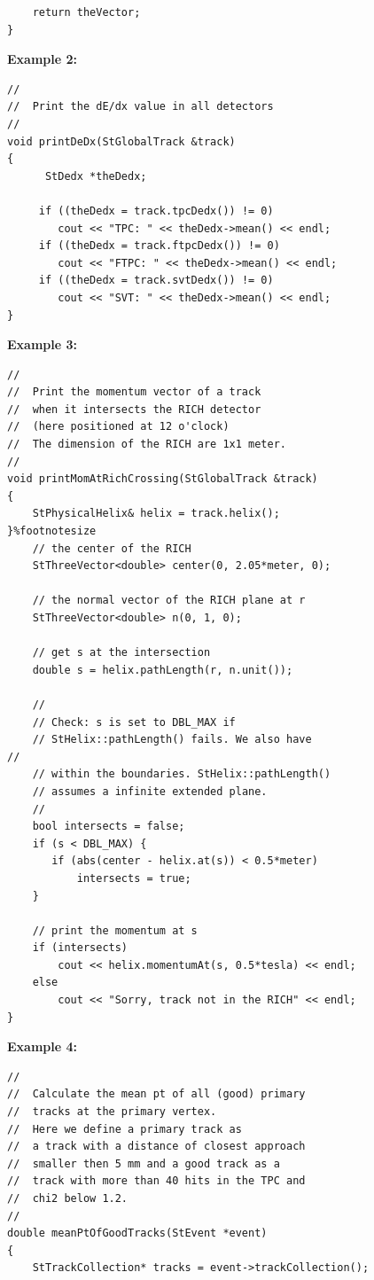 \begin{Entry}
{\begin{verbatim}
    return theVector;
}
\end{verbatim}
}%

{\bf Example 2:}
{\footnotesize
\begin{verbatim}
//
//  Print the dE/dx value in all detectors
//
void printDeDx(StGlobalTrack &track)
{
      StDedx *theDedx;

     if ((theDedx = track.tpcDedx()) != 0)
        cout << "TPC: " << theDedx->mean() << endl;
     if ((theDedx = track.ftpcDedx()) != 0)
        cout << "FTPC: " << theDedx->mean() << endl;
     if ((theDedx = track.svtDedx()) != 0)
        cout << "SVT: " << theDedx->mean() << endl;
}
\end{verbatim}
}%

{\bf Example 3:}
{\footnotesize
\begin{verbatim}
//
//  Print the momentum vector of a track
//  when it intersects the RICH detector
//  (here positioned at 12 o'clock)
//  The dimension of the RICH are 1x1 meter.
//
void printMomAtRichCrossing(StGlobalTrack &track)
{
    StPhysicalHelix& helix = track.helix();
}%footnotesize   
    // the center of the RICH
    StThreeVector<double> center(0, 2.05*meter, 0);

    // the normal vector of the RICH plane at r
    StThreeVector<double> n(0, 1, 0);

    // get s at the intersection
    double s = helix.pathLength(r, n.unit());

    //
    // Check: s is set to DBL_MAX if
    // StHelix::pathLength() fails. We also have
//  
    // within the boundaries. StHelix::pathLength()
    // assumes a infinite extended plane.
    //
    bool intersects = false;
    if (s < DBL_MAX) {
       if (abs(center - helix.at(s)) < 0.5*meter)
           intersects = true;
    }

    // print the momentum at s
    if (intersects)
        cout << helix.momentumAt(s, 0.5*tesla) << endl;
    else
        cout << "Sorry, track not in the RICH" << endl;
}
\end{verbatim}
}%

{\bf Example 4:}
{\footnotesize
\begin{verbatim}
//
//  Calculate the mean pt of all (good) primary
//  tracks at the primary vertex.
//  Here we define a primary track as
//  a track with a distance of closest approach
//  smaller then 5 mm and a good track as a
//  track with more than 40 hits in the TPC and
//  chi2 below 1.2.
//
double meanPtOfGoodTracks(StEvent *event)
{
    StTrackCollection* tracks = event->trackCollection();


\end{verbatim}}
\end{Entry}
